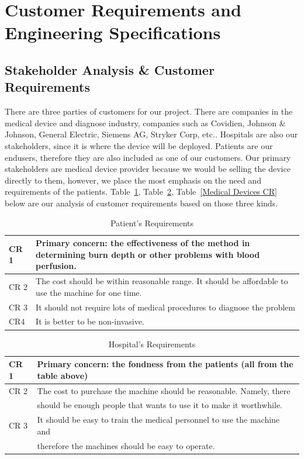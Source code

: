 \documentclass[paper=letter, fontsize=11pt]{scrartcl}
\numberwithin{equation}{section}		%
\numberwithin{figure}{section}			%
\numberwithin{table}{section}			%
\begin{document}
\pagebreak
\section{Customer Requirements and Engineering Specifications}
\subsection{Stakeholder Analysis \& Customer Requirements}
There are three parties of customers for our project. There are companies in the medical device and diagnose industry, companies such as Covidien, Johnson \& Johnson, General Electric, Siemens AG, Stryker Corp, etc.\cite{cres1}. Hospitals are also our stakeholders, since it is where the device will be deployed. Patients are our endusers, therefore they are also included as one of our customers.
Our primary stakeholders are medical device provider because we would be selling the device directly to them, however, we place the most emphasis on the need and requirements of the patients. Table~\ref{Patients CR}, Table~\ref{Hospitals CR}, Table~\ref{Medical Devices CR} below are our analysis of customer requirements based on those three kinds.
\begin {table}[H]
\centering
\begin{tabular}{l|p{12cm}}
CR 1 & Primary concern: the effectiveness of the method in determining burn depth or other problems with blood perfusion. \\ \hline
CR 2 & The cost should be within reasonable range. It should be affordable to use the machine for one time. \\ \hline
CR 3 & It should not require lots of medical procedures to diagnose the problem \\ \hline
CR4 & It is better to be non-invasive.
\end{tabular}
\caption{Patient's Requirements}
\label{Patients CR}
\end{table}

\begin {table}[H]
\centering
\begin{tabular}{l|p{12cm}}
CR 1 & Primary concern: the fondness from the patients (all from the table above) \\ \hline
CR 2 & The cost to purchase the machine should be reasonable. Namely, there \\ &should be enough people that wants to use it to make it worthwhile. \\ \hline
CR 3 &  It should be easy to train the medical personnel to use the machine and \\ & therefore the machines should be easy to operate. \\
\end{tabular}
\caption{Hospital's Requirements}
\label{Hospitals CR}
\end {table}
\end{document}
